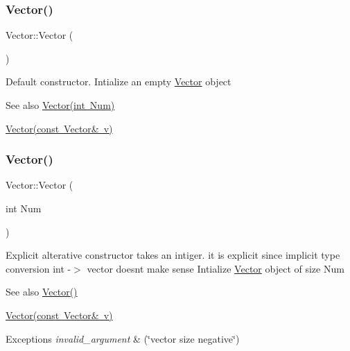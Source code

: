 \subsubsection{\texorpdfstring{Vector()}{Vector()}\hspace{0.1cm}{\footnotesize\ttfamily [1/3]}}
{\footnotesize\ttfamily Vector\+::\+Vector (\begin{DoxyParamCaption}{ }\end{DoxyParamCaption})}

Default constructor. Intialize an empty \mbox{\hyperlink{class_vector}{Vector}} object \begin{DoxySeeAlso}{See also}
\mbox{\hyperlink{class_vector_acbdf66550f2caa0a64e0b356fb63a277}{Vector(int Num)}} 

\mbox{\hyperlink{class_vector_a5f04e343b7306ad11f8a82c89b486764}{Vector(const Vector\& v)}} 
\end{DoxySeeAlso}
\mbox{\label{class_vector_acbdf66550f2caa0a64e0b356fb63a277}} 
\subsubsection{\texorpdfstring{Vector()}{Vector()}\hspace{0.1cm}{\footnotesize\ttfamily [2/3]}}
{\footnotesize\ttfamily Vector\+::\+Vector (\begin{DoxyParamCaption}\item[{int}]{Num }\end{DoxyParamCaption})\hspace{0.3cm}{\ttfamily [explicit]}}

Explicit alterative constructor takes an intiger. it is explicit since implicit type conversion int -\/$>$ vector doesn\textquotesingle{}t make sense Intialize \mbox{\hyperlink{class_vector}{Vector}} object of size Num \begin{DoxySeeAlso}{See also}
\mbox{\hyperlink{class_vector_a6f80c73b5f18dcf3f8e36065bdc8b9e5}{Vector()}} 

\mbox{\hyperlink{class_vector_a5f04e343b7306ad11f8a82c89b486764}{Vector(const Vector\& v)}} 
\end{DoxySeeAlso}

\begin{DoxyExceptions}{Exceptions}
{\em invalid\+\_\+argument} & (\char`\"{}vector size negative\char`\"{}) \\
\hline
\end{DoxyExceptions}

